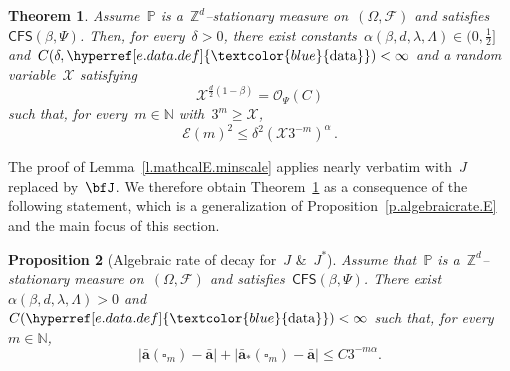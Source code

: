 \documentclass[11pt,twoside]{article} %
\let\oldsquare\square %
\renewcommand{\square}{\oldsquare}
\numberwithin{equation}{section}
\newtheorem{theorem}{Theorem}[section]
\newtheorem{proposition}[theorem]{Proposition}
\theoremstyle{definition}
\newcommand{\dataref}{\hyperref[e.data.def]{\textcolor{blue}{\ensuremath{\mathrm{data}}}}}
\let\originalleft\left
\let\originalright\right
\renewcommand{\left}{\mathopen{}\mathclose\bgroup\originalleft}
\renewcommand{\right}{\aftergroup\egroup\originalright}
\newcommand*{\N}{\ensuremath{\mathbb{N}}}
\newcommand*{\Zd}{\ensuremath{\mathbb{Z}^d}}
\renewcommand{\a}{\mathbf{a}}
\newcommand{\ahom}{\bar{\a}}
\newcommand{\cu}{\square}
\newcommand{\F}{\mathcal{F}}
\renewcommand{\P}{\mathbb{P}}
\newcommand{\E}{\mathbb{E}}
\newcommand{\X}{\mathcal{X}}
\renewcommand{\O}{\mathcal{O}}
\newcommand{\CFS}{\mathsf{CFS}}
\begin{document}
\begin{theorem}
\label{t.subadd.converge.nosymm}
Assume~$\P$ is a~$\Zd$--stationary measure on~$(\Omega,\F)$ and satisfies~$\CFS(\beta,\Psi)$. Then, for every~$\delta>0$, there exist constants~$\alpha(\beta,d,\lambda,\Lambda) \in (0,\tfrac12]$ and~$C(\delta,\dataref)<\infty$ and a random variable~$\X$ satisfying 
\begin{equation}
\label{e.mmmbound.nosymm}
\X^{\frac d2 (1-\beta)}
= \O_\Psi(C)
\end{equation}
such that, for every~$m\in\N$ with~$3^m\geq \X$, 
\begin{equation} 
\label{e.aastar.concentrate.DD.nosymm}
\mathcal{E}(m)^2
\leq \delta^2 ( \X 3^{-m})^{\alpha} 
\,.
\end{equation}
\end{theorem}

The proof of Lemma~\ref{l.mathcalE.minscale} applies nearly verbatim with~$J$ replaced by~$\bfJ$. We therefore obtain Theorem~\ref{t.subadd.converge.nosymm} as a consequence of the following statement, which is a generalization of Proposition~\ref{p.algebraicrate.E} and the main focus of this section.

\begin{proposition}[Algebraic rate of decay for~$J$ \&~$J^*$]
\label{p.algebraic.nosymm}
\hspace{-1pt} 
Assume that~$\P$ is a~$\Zd$--stationary measure on~$(\Omega,\F)$ and satisfies~$\CFS(\beta,\Psi)$. 
There exist~$\alpha(\beta,d,\lambda,\Lambda) >0$ and~$C(\dataref)<\infty$
such that, for every~$m\in\N$,  
\begin{equation}
\label{e.EJtozero.rate.nosymm}
\bigl| \ahom(\cu_m) - \ahom \bigr|
+
\bigl| \ahom_*(\cu_m) - \ahom \bigr|
\leq 
C3^{-m\alpha}. 
\end{equation}
\end{proposition}
\end{document}
